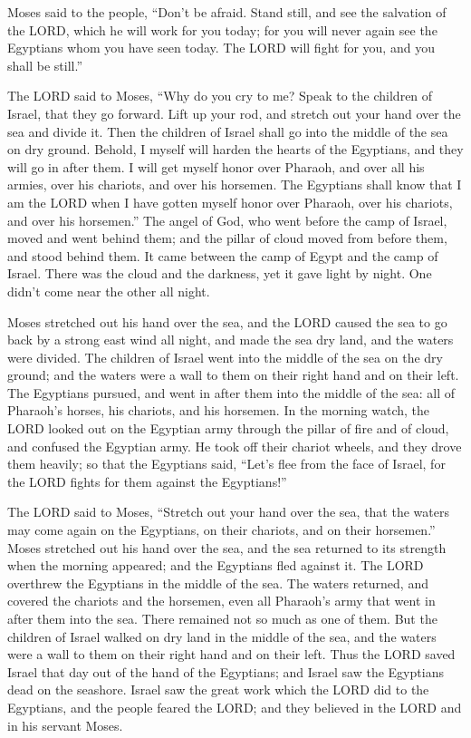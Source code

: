 \myverse{}Moses said to the people, “Don’t be afraid. Stand still, and
see the salvation of the LORD, which he will work for you today; for you will never again see the Egyptians
whom you have seen today.
\myverse{}The LORD will fight for you, and you shall be still.”


\myverse{}The LORD said to Moses, “Why do you cry to me? Speak to the
children of Israel, that they go forward.
\myverse{}Lift up your rod, and stretch out your hand over the sea and divide it. Then
the children of Israel shall go into the middle of the sea on dry ground.
\myverse{}Behold, I myself will harden the hearts of the Egyptians, and they will go
in after them. I will get myself honor over Pharaoh, and over all his armies, over his chariots, and over
his horsemen.
\myverse{}The Egyptians shall know that I am the LORD when I have gotten myself honor
over Pharaoh, over his chariots, and over his horsemen.”
\myverse{}The angel of God, who went before the camp of Israel, moved and went behind
them; and the pillar of cloud moved from before them, and stood behind them.
\myverse{}It came between the camp of Egypt and the camp of Israel. There was the cloud
and the darkness, yet it gave light by night. One didn’t come near the other all night.


\myverse{}Moses stretched out his hand over the sea, and the LORD caused
the sea to go back by a strong east wind all night, and made the sea dry land, and the waters were divided.
\myverse{}The children of Israel went into the middle of the sea on the dry ground;
and the waters were a wall to them on their right hand and on their left.
\myverse{}The Egyptians pursued, and went in after them into the middle of the sea:
all of Pharaoh’s horses, his chariots, and his horsemen.
\myverse{}In the morning watch, the LORD looked out on the Egyptian army through the
pillar of fire and of cloud, and confused the Egyptian army.
\myverse{}He took off their chariot wheels, and they drove them heavily; so that the
Egyptians said, “Let’s flee from the face of Israel, for the LORD fights for them against the Egyptians!”


\myverse{}The LORD said to Moses, “Stretch out your hand over the sea,
that the waters may come again on the Egyptians, on their chariots, and on their horsemen.”
\myverse{}Moses stretched out his hand over the sea, and the sea returned to its strength
when the morning appeared; and the Egyptians fled against it. The LORD overthrew the Egyptians in the
middle of the sea.
\myverse{}The waters returned, and covered the chariots and the horsemen, even all
Pharaoh’s army that went in after them into the sea. There remained not so much as one of them.
\myverse{}But the children of Israel walked on dry land in the middle of the sea, and
the waters were a wall to them on their right hand and on their left.
\myverse{}Thus the LORD saved Israel that day out of the hand of the Egyptians; and
Israel saw the Egyptians dead on the seashore.
\myverse{}Israel saw the great work which the LORD did to the Egyptians, and the people
feared the LORD; and they believed in the LORD and in his servant Moses.


